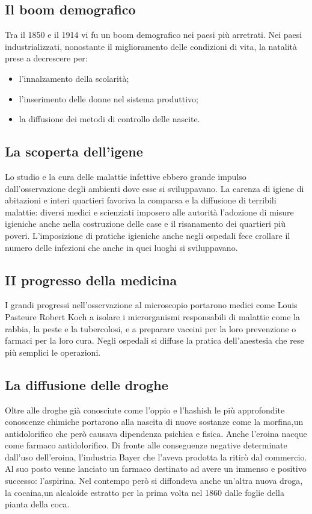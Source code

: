 \documentclass{report}
\begin{document}
\subsection{Il boom demografico}
Tra il 1850 e il 1914 vi fu un boom demografico nei paesi più arretrati. Nei paesi industrializzati, nonostante il miglioramento delle condizioni di vita, la natalità prese a decrescere per:
\begin{itemize}
  \item l'innalzamento della scolarità;
  \item l'inserimento delle donne nel sistema produttivo;
  \item la diffusione dei metodi di controllo delle nascite.
\end{itemize}

\subsection{La scoperta dell'igene}
Lo studio e la cura delle malattie infettive ebbero grande impulso dall'osservazione degli ambienti dove esse si sviluppavano. La carenza di igiene di abitazioni e interi quartieri favoriva la comparsa e la diffusione di terribili malattie: diversi medici e scienziati imposero alle autorità l'adozione di misure igieniche anche nella costruzione delle case e il risanamento dei quartieri più poveri. L'imposizione di pratiche igieniche anche negli ospedali fece crollare il numero delle infezioni che anche in quei luoghi si sviluppavano.

\subsection{II progresso della medicina}
I grandi progressi nell'osservazione al microscopio portarono medici come Louis Pasteure Robert Koch a isolare i microrganismi responsabili di malattie come la rabbia, la peste e la tubercolosi, e a preparare vaceini per la loro prevenzione o farmaci per la loro cura. Negli ospedali si diffuse la pratica dell'anestesia che rese più semplici le operazioni.

\subsection{La diffusione delle droghe}
Oltre alle droghe già conosciute come l'oppio e l'hashish le più approfondite conoscenze chimiche portarono alla nascita di nuove sostanze come la morfina,un antidolorifico che però causava dipendenza psichica e fisica. Anche l'eroina nacque come farmaco antidolorifico. Di fronte alle conseguenze negative determinate dall'uso dell'eroina, l'industria Bayer che
l'aveva prodotta la ritirò dal commercio. Al suo posto venne lanciato un farmaco destinato ad avere un immenso e positivo successo: l'aspirina. Nel contempo però si diffondeva anche un'altra nuova droga, la cocaina,un alcaloide estratto per la prima volta nel 1860 dalle foglie della pianta della coca.
\end{document}
